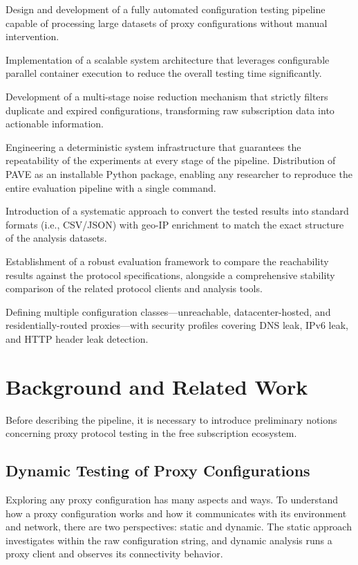 \documentclass[10pt,conference]{IEEEtran}
\begin{document}
\begin{sloppypar}
\begin{LaTeXdescription}
    \item[Automated Experimental Pipeline] Design and development of a fully automated configuration testing pipeline capable of processing large datasets of proxy configurations without manual intervention.
    \item[Scalable Architecture] Implementation of a scalable system architecture that leverages configurable parallel container execution to reduce the overall testing time significantly.
    \item[Data Deduplication] Development of a multi-stage noise reduction mechanism that strictly filters duplicate and expired configurations, transforming raw subscription data into actionable information.
    \item[Repeatability] Engineering a deterministic system infrastructure that guarantees the repeatability of the experiments at every stage of the pipeline.
    Distribution of PAVE as an installable Python package, enabling any researcher to reproduce the entire evaluation pipeline with a single command.
    \item[Standardized Data Enrichment] Introduction of a systematic approach to convert the tested results into standard formats (i.e., CSV/JSON) with geo-IP enrichment to match the exact structure of the analysis datasets.
    \item[Evaluation and Benchmarking] Establishment of a robust evaluation framework to compare the reachability results against the protocol specifications, alongside a comprehensive stability comparison of the related protocol clients and analysis tools.
    \item[Result Categories] Defining multiple configuration classes---unreachable, datacenter-hosted, and residentially-routed proxies---with security profiles covering DNS leak, IPv6 leak, and HTTP header leak detection.
\end{LaTeXdescription}
\end{sloppypar}

\section{Background and Related Work}
Before describing the pipeline, it is necessary to introduce preliminary notions concerning proxy protocol testing in the free subscription ecosystem.

\subsection{Dynamic Testing of Proxy Configurations}
Exploring any proxy configuration has many aspects and ways.
To understand how a proxy configuration works and how it communicates with its environment and network, there are two perspectives: static and dynamic.
The static approach investigates within the raw configuration string, and dynamic analysis runs a proxy client and observes its connectivity behavior.
\end{document}
